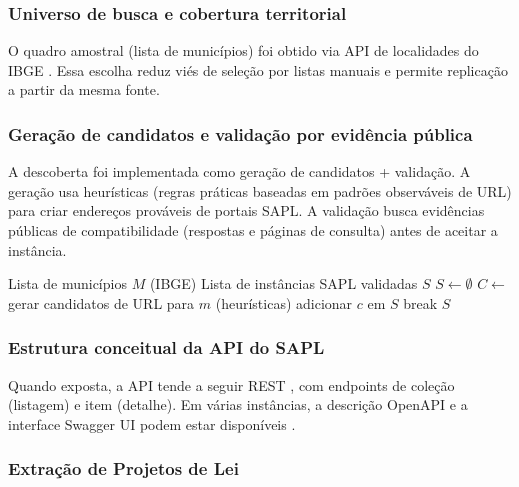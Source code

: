 \documentclass[10pt,a4paper]{article}
\begin{document}
\subsubsection{Universo de busca e cobertura territorial}

O quadro amostral (lista de municípios) foi obtido via API de localidades do IBGE \cite{ibge_localidades_api}. Essa escolha reduz viés de seleção por listas manuais e permite replicação a partir da mesma fonte.

\subsubsection{Geração de candidatos e validação por evidência pública}

A descoberta foi implementada como geração de candidatos + validação. A geração usa heurísticas (regras práticas baseadas em padrões observáveis de URL) para criar endereços prováveis de portais SAPL. A validação busca evidências públicas de compatibilidade (respostas e páginas de consulta) antes de aceitar a instância.

\begin{algorithm}[H]
\caption{Descoberta e validação de instâncias SAPL (visão conceitual)}
\label{alg:descoberta}
\begin{algorithmic}[1]
\Require Lista de municípios $M$ (IBGE)
\Ensure Lista de instâncias SAPL validadas $S$
\State $S \gets \emptyset$
  \State $C \gets$ gerar candidatos de URL para $m$ (heurísticas)
      \State adicionar $c$ em $S$
      \State break 
    \EndIf
  \EndFor
\EndFor
\State \Return $S$
\end{algorithmic}
\end{algorithm}

\subsubsection{Estrutura conceitual da API do SAPL}

Quando exposta, a API tende a seguir REST \cite{fielding_rest_2000}, com endpoints de coleção (listagem) e item (detalhe). Em várias instâncias, a descrição OpenAPI e a interface Swagger UI podem estar disponíveis \cite{openapi_3_2,swagger_ui}.

\subsubsection{Extração de Projetos de Lei}
\end{document}
